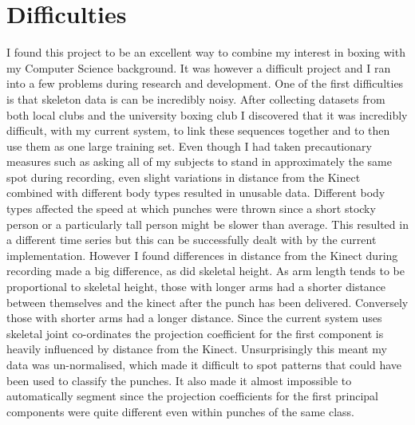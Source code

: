 \section{Difficulties}
I found this project to be an excellent way to combine my interest in boxing with my Computer Science background. It was however a difficult project and I ran into a few problems during research and development.
One of the first difficulties is that skeleton data is can be incredibly noisy. After collecting datasets from both local clubs and the university boxing club I discovered that it was incredibly difficult, with my current system, to link these sequences together and to then use them as one large training set. Even though I had taken precautionary measures such as asking all of my subjects to stand in approximately the same spot during recording, even slight variations in distance from the Kinect combined with different body types resulted in unusable data. 
Different body types affected the speed at which punches were thrown since a short stocky person or a particularly tall person might be slower than average. This resulted in a different time series but this can be successfully dealt with by the current implementation.
However I found differences in distance from the Kinect during recording made a big difference, as did skeletal height. As arm length tends to be proportional to skeletal height, those with longer arms had a shorter distance between themselves and the kinect after the punch has been delivered. Conversely those with shorter arms had a longer distance.
Since the current system uses skeletal joint co-ordinates the projection coefficient for the first component is heavily influenced by distance from the Kinect. Unsurprisingly this meant my data was un-normalised, which made it difficult to spot patterns that could have been used to classify the punches. It also made it almost impossible to automatically segment since the projection coefficients for the first principal components were quite different even within punches of the same class.

